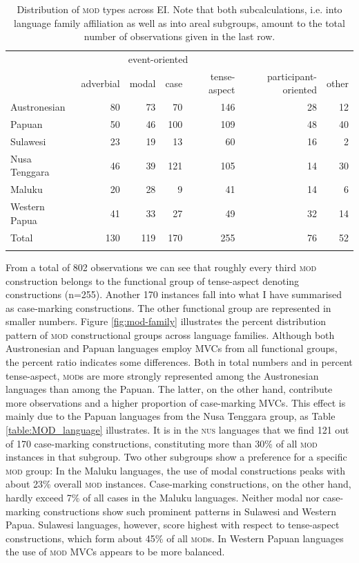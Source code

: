 \begin{table}
\begin{tabular}{lrrrr|rr}
  \lsptoprule
& \multicolumn{4}{c}{event-oriented} & & \\
 & {adverbial} & {modal} & {case} & {tense-aspect} & {participant-oriented} & {other}\\  
  \hline
  Austronesian & 80 & 73 & 70 & 146 & 28 & 12 \tabularnewline
  Papuan & 50 & 46 & 100 & 109 & 48 & 40 \tabularnewline
   \hline
  Sulawesi & 23 & 19 & 13 & 60 & 16 & 2 \tabularnewline
  Nusa Tenggara & 46 & 39 & 121 & 105 & 14 & 30 \tabularnewline
  Maluku & 20 & 28 & 9 & 41 & 14 & 6 \tabularnewline 
  Western Papua & 41 & 33 & 27 & 49 & 32 & 14 \tabularnewline 
\hline
Total & 130 & 119 & 170 & 255 & 76 & 52 \tabularnewline
\lspbottomrule
\end{tabular}
\caption[Distribution of \textsc{mod} types across EI]{Distribution of \textsc{mod} types across EI. Note that both subcalculations, i.e. into language family affiliation as well as into areal subgroups,  amount to the total number of observations given in the last row.}
\label{table:MOD_overview}
\end{table}

From a total of 802 observations we can see that roughly every third \textsc{mod} construction belongs to the functional group of tense-aspect denoting constructions (n=255). Another 170 instances fall into what I have summarised as case-marking constructions. The other functional group are represented in smaller numbers. Figure \ref{fig:mod-family} illustrates the percent distribution pattern of \textsc{mod} constructional groups across language families. Although both Austronesian and Papuan languages employ MVCs from all functional groups, the percent ratio indicates some differences. Both in total numbers and in percent tense-aspect, \textsc{mod}s are more strongly represented among the Austronesian languages than among the Papuan. The latter, on the other hand, contribute more observations and a higher proportion of case-marking MVCs. This effect is mainly due to the Papuan languages from the Nusa Tenggara group, as Table \ref{table:MOD_language} illustrates. It is in the \textsc{nus} languages that we find 121 out of 170 case-marking constructions, constituting more than 30\% of all \textsc{mod} instances in that subgroup. Two other subgroups show a preference for a specific \textsc{mod} group: In the Maluku languages, the use of modal constructions peaks with about 23\% overall \textsc{mod} instances. Case-marking constructions, on the other hand, hardly exceed 7\% of all cases in the Maluku languages. Neither modal nor case-marking constructions show such prominent patterns in Sulawesi and Western Papua. Sulawesi languages, however, score highest with respect to tense-aspect constructions, which form about 45\% of all \textsc{mod}s. In Western Papuan languages the use of \textsc{mod} MVCs appears to be more balanced.


